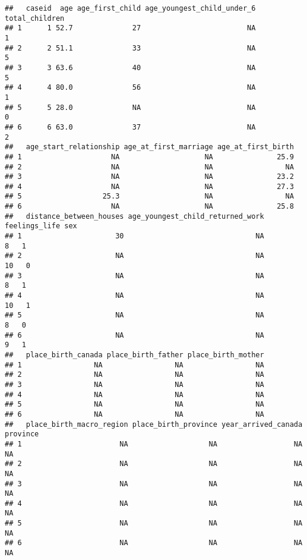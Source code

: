 \documentclass[
]{article}
\begin{document}
\begin{verbatim}
##   caseid  age age_first_child age_youngest_child_under_6 total_children
## 1      1 52.7              27                         NA              1
## 2      2 51.1              33                         NA              5
## 3      3 63.6              40                         NA              5
## 4      4 80.0              56                         NA              1
## 5      5 28.0              NA                         NA              0
## 6      6 63.0              37                         NA              2
##   age_start_relationship age_at_first_marriage age_at_first_birth
## 1                     NA                    NA               25.9
## 2                     NA                    NA                 NA
## 3                     NA                    NA               23.2
## 4                     NA                    NA               27.3
## 5                   25.3                    NA                 NA
## 6                     NA                    NA               25.8
##   distance_between_houses age_youngest_child_returned_work feelings_life sex
## 1                      30                               NA             8   1
## 2                      NA                               NA            10   0
## 3                      NA                               NA             8   1
## 4                      NA                               NA            10   1
## 5                      NA                               NA             8   0
## 6                      NA                               NA             9   1
##   place_birth_canada place_birth_father place_birth_mother
## 1                 NA                 NA                 NA
## 2                 NA                 NA                 NA
## 3                 NA                 NA                 NA
## 4                 NA                 NA                 NA
## 5                 NA                 NA                 NA
## 6                 NA                 NA                 NA
##   place_birth_macro_region place_birth_province year_arrived_canada province
## 1                       NA                   NA                  NA       NA
## 2                       NA                   NA                  NA       NA
## 3                       NA                   NA                  NA       NA
## 4                       NA                   NA                  NA       NA
## 5                       NA                   NA                  NA       NA
## 6                       NA                   NA                  NA       NA

\end{verbatim}
\end{document}
